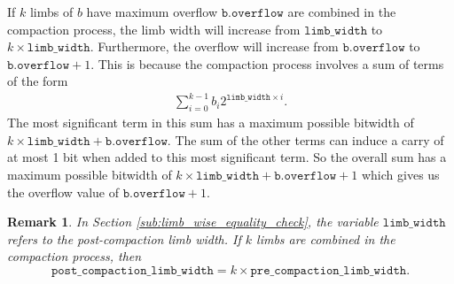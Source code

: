 \documentclass[a4paper, 12pt]{article}
\newtheorem*{remark}{Remark}
\begin{document}
If $k$ limbs of $b$ have maximum overflow $\texttt{b.overflow}$ are combined in the compaction process, the limb width will increase from $\texttt{limb\_width}$ to $k \times \texttt{limb\_width}$. 
Furthermore, the overflow will increase from $\texttt{b.overflow}$ to $\texttt{b.overflow} + 1$. This is because the compaction process involves a sum of terms of the form
\begin{align*}
  \sum_{i=0}^{k-1} b_i 2^{\texttt{limb\_width} \times i}.
\end{align*}
The most significant term in this sum has a maximum possible bitwidth of $k\times \texttt{limb\_width} + \texttt{b.overflow}$. The sum of the other terms can induce a carry of at most 1 bit when added to this most significant term. So the overall sum has a maximum possible bitwidth of $k\times \texttt{limb\_width} + \texttt{b.overflow}+1$ which gives us the overflow value of $\texttt{b.overflow} + 1$.

\begin{remark}
  In Section \ref{sub:limb_wise_equality_check}, the variable $\texttt{limb\_width}$ refers to the post-compaction limb width. If $k$ limbs are combined in the compaction process, then $$\texttt{post\_compaction\_limb\_width} = k \times \texttt{pre\_compaction\_limb\_width}.$$
\end{remark}
\end{document}
